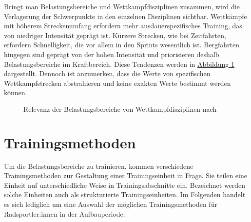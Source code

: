 Bringt man Belastungsbereiche und Wettkampfdisziplinen zusammen, wird die Verlagerung der Schwerpunkte in den einzelnen Disziplinen sichtbar. Wettkämpfe mit höherem Streckenumfang erfordern mehr ausdauerspezifisches Training, das von niedriger Intensität geprägt ist. Kürzere Strecken, wie bei Zeitfahrten, erfordern Schnelligkeit, die vor allem in den Sprints wesentlich ist. Bergfahrten hingegen sind geprägt von der hohen Intensität und priorisieren deshalb Belastungsbereiche im Kraftbereich. Diese Tendenzen werden in \hyperref[fig:wettkampfLeistungsbereiche]{Abbildung \ref{fig:wettkampfLeistungsbereiche}} dargestellt. Dennoch ist anzumerken, dass die Werte von spezifischen Wettkampfstrecken abstrahieren und keine exakten Werte bestimmt werden können. 
\begin{figure}[hb]
    \centering
    \caption{Relevanz der Belastungsbereiche von Wettkampfdisziplinen nach \cite[30]{Radsporttraining}}
    \label{fig:wettkampfLeistungsbereiche}
\end{figure}
\section{Trainingsmethoden}
\label{grundlagen:methoden}
Um die Belastungsbereiche zu trainieren, kommen verschiedene Trainingsmethoden zur Gestaltung einer Trainingseinheit in Frage. Sie teilen eine Einheit auf unterschiedliche Weise in Trainingsabschnitte ein. Bezeichnet werden solche Einheiten auch als strukturierte Trainingseinheiten. Im Folgenden handelt es sich lediglich um eine Auswahl der möglichen Trainingsmethoden für Radsportler:innen in der Aufbauperiode. \cite[40-43]{Radsporttraining}
